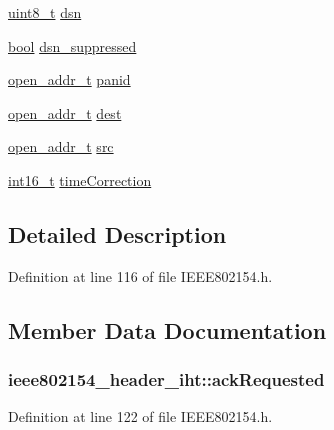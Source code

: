 \begin{DoxyCompactItemize}
\item 
\hyperlink{_p_e___types_8h_aba7bc1797add20fe3efdf37ced1182c5}{uint8\+\_\+t} \hyperlink{structieee802154__header__iht_ab9621c67771b8f20205a528c8766b6ec}{dsn}
\item 
\hyperlink{_p_e___types_8h_a97a80ca1602ebf2303258971a2c938e2}{bool} \hyperlink{structieee802154__header__iht_a687aba87319800176446420aa0995396}{dsn\+\_\+suppressed}
\item 
\hyperlink{structopen__addr__t}{open\+\_\+addr\+\_\+t} \hyperlink{structieee802154__header__iht_adb1dbee92649183063e5a8508b19fcb2}{panid}
\item 
\hyperlink{structopen__addr__t}{open\+\_\+addr\+\_\+t} \hyperlink{structieee802154__header__iht_a7b64098d4c97557e426488705f8dae86}{dest}
\item 
\hyperlink{structopen__addr__t}{open\+\_\+addr\+\_\+t} \hyperlink{structieee802154__header__iht_affec5666573dedd35d1adb7514d32cb3}{src}
\item 
\hyperlink{_p_e___types_8h_a932e6ccc3d54c58f761c1aead83bd6d7}{int16\+\_\+t} \hyperlink{structieee802154__header__iht_abf74490f5f386e98f7a7e82930aee6e1}{time\+Correction}
\end{DoxyCompactItemize}


\subsection{Detailed Description}


Definition at line 116 of file I\+E\+E\+E802154.\+h.



\subsection{Member Data Documentation}
\subsubsection[{\texorpdfstring{ack\+Requested}{ackRequested}}]{ ieee802154\+\_\+header\+\_\+iht\+::ack\+Requested}\hypertarget{structieee802154__header__iht_a07cd720e8c63b0d4f0d76f91577053b0}{}\label{structieee802154__header__iht_a07cd720e8c63b0d4f0d76f91577053b0}


Definition at line 122 of file I\+E\+E\+E802154.\+h.

